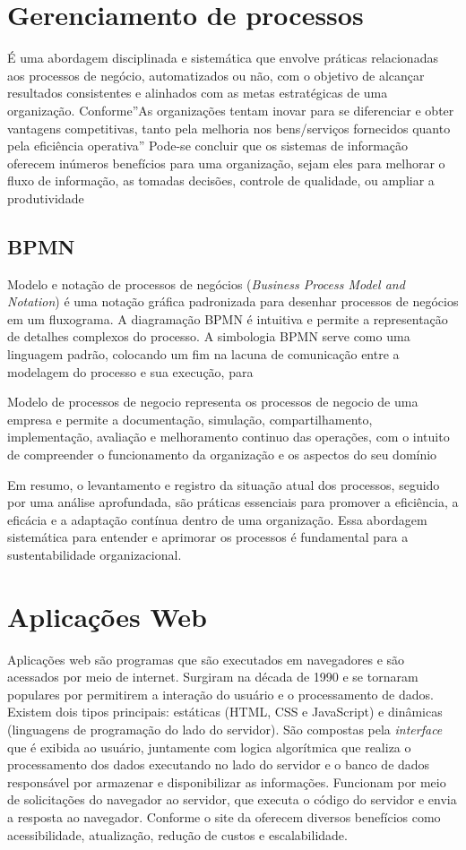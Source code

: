 \section{Gerenciamento de processos}
É uma abordagem disciplinada e sistemática que envolve práticas relacionadas aos processos de negócio, automatizados ou não, com o objetivo de alcançar resultados consistentes e alinhados com as metas estratégicas de uma organização. 
Conforme\cite{davila2008inovaccao}''As organizações tentam inovar para se diferenciar e obter vantagens competitivas, tanto pela melhoria nos bens/serviços fornecidos quanto pela eficiência operativa''
Pode-se concluir que os sistemas de informação oferecem inúmeros benefícios para uma organização, sejam eles para melhorar o fluxo de informação, as tomadas decisões, controle de qualidade, ou ampliar a produtividade
\subsection{BPMN}
Modelo e notação de processos de negócios (\textit{Business Process Model and Notation}) é uma notação gráfica padronizada para desenhar processos de negócios em um fluxograma. A diagramação BPMN é intuitiva e permite a representação de detalhes complexos do processo. A simbologia BPMN serve como uma linguagem padrão, colocando um fim na lacuna de comunicação entre a modelagem do processo e sua execução, para 
\begin{citacao}
	\cite{bitencourt2016elicitaccao} 
	Modelo de processos de negocio representa os processos de negocio de uma empresa e permite a documentação, simulação, compartilhamento, implementação, avaliação e melhoramento continuo das operações, com o intuito de compreender o funcionamento da organização e os aspectos do seu domínio
	
\end{citacao}
Em resumo, o levantamento e registro da situação atual dos processos, seguido por uma análise aprofundada, são práticas essenciais para promover a eficiência, a eficácia e a adaptação contínua dentro de uma organização. Essa abordagem sistemática para entender e aprimorar os processos é fundamental para a sustentabilidade organizacional.

\section{Aplicações Web}
Aplicações web são programas que são executados em navegadores e são acessados por meio de internet.
Surgiram na década de 1990 e se tornaram populares por permitirem a interação do usuário e o processamento de dados.
Existem dois tipos principais: estáticas (HTML, CSS e JavaScript) e dinâmicas (linguagens de programação do lado do servidor).
São compostas pela \textit{interface} que é exibida ao usuário, juntamente com logica algorítmica que realiza o processamento dos dados executando no lado do servidor e o banco de dados responsável por armazenar e disponibilizar as informações.
Funcionam por meio de solicitações do navegador ao servidor, que executa o código do servidor e envia a resposta ao navegador.
Conforme o site da \cite{amazonAplicaoWeb} oferecem diversos benefícios como acessibilidade, atualização, redução de custos e escalabilidade.

